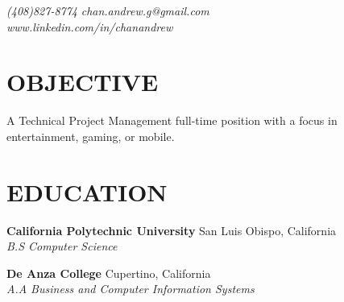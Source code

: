 \documentclass[margin,line]{resume}
\begin{document}
\fontsize{9.5pt}{9.5pt}\selectfont
\def \identsize {12mm}

{
  \sc
    \hfill {\infosize\textsl{(408)827-8774}} {\infosize\textsl{chan.andrew.g@gmail.com}}                    \\\vspace{0mm}
    \hfill {\infosize\textsl{www.linkedin.com/in/chanandrew}}   \\\vspace{-10mm}
}

\begin{resume}

\vspace{-2.5mm}

    \section{\mysidestyle \textbf{\large{O}\small{BJECTIVE}}}

    A Technical Project Management full-time position with a focus in entertainment, gaming, or mobile.

\sectionline

    \section{\mysidestyle \textbf{\large{E}\small{DUCATION}}}

    \textbf{\listing California Polytechnic University} \hfill San Luis Obispo, California\\
    \hspace*{\identsize} \textsl{B.S Computer Science} \vspace{-2.5mm}
    
    \textbf{\listing De Anza College} \hfill Cupertino, California\\
    \hspace*{\identsize} \textsl{A.A Business and Computer Information Systems}

\sectionline


\end{resume}
\end{document}
